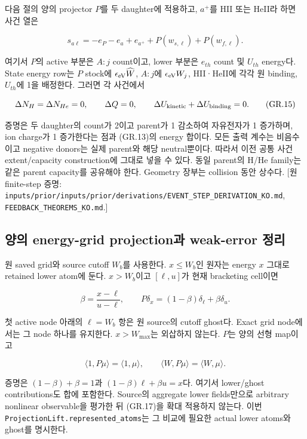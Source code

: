 \documentclass[11pt,a4paper]{article}
\begin{document}
다음 절의 양의 projector \(P\)를 두 daughter에 적용하고, \(a^+\)를 HII 또는 HeII라 하면 사건 열은

\[
 s_{a\ell}=-e_{P}-e_a+e_{a^+}
   +P(w_{s,\ell})+P(w_{f,\ell}).
\tag{GR.14}
\]

여기서 \(P\)의 active 부분은 \(A:j\) count이고, lower 부분은 \(e_{th}\) count 및 \(U_{th}\) energy다. State energy row는 \(P\) stock에 \(\epsilon_{\rm eV}\widehat W\), \(A:j\)에 \(\epsilon_{\rm eV}W_j\), HII·HeII에 각각 원 binding, \(U_{th}\)에 1을 배정한다. 그러면 각 사건에서

\[
 \Delta N_H=\Delta N_{He}=0,\qquad
 \Delta Q=0,\qquad
 \Delta U_{\rm kinetic}+\Delta U_{\rm binding}=0.
\tag{GR.15}
\]

증명은 두 daughter의 count가 2이고 parent가 1 감소하여 자유전자가 1 증가하며, ion charge가 1 증가한다는 점과 (GR.13)의 energy 합이다. 모든 출력 계수는 비음수이고 negative donors는 실제 parent와 해당 neutral뿐이다. 따라서 이전 공통 사건 extent/capacity construction에 그대로 넣을 수 있다. 동일 parent의 H/He family는 같은 parent capacity를 공유해야 한다. Geometry 장부는 collision 동안 상수다. {[}원 finite-step 증명: \nolinkurl{inputs/prior/inputs/prior/derivations/EVENT_STEP_DERIVATION_KO.md}, \texttt{FEEDBACK\_THEOREMS\_KO.md}.{]}

\hypertarget{uxc591uxc758-energy-grid-projectionuxacfc-weak-error-uxc815uxb9ac}{%
\subsection{양의 energy-grid projection과 weak-error 정리}\label{uxc591uxc758-energy-grid-projectionuxacfc-weak-error-uxc815uxb9ac}}

원 saved grid와 source cutoff \(W_b\)를 사용한다. \(x\le W_b\)인 원자는 energy \(x\) 그대로 retained lower atom에 둔다. \(x>W_b\)이고 \([\ell,u]\)가 현재 bracketing cell이면

\[
 \beta=\frac{x-\ell}{u-\ell},\qquad
 P\delta_x=(1-\beta)\delta_\ell+\beta\delta_u.
\tag{GR.16}
\]

첫 active node 아래의 \(\ell=W_b\) 항은 원 source의 cutoff ghost다. Exact grid node에서는 그 node 하나를 유지한다. \(x>W_{\max}\)는 외삽하지 않는다. \(P\)는 양의 선형 map이고

\[
 \langle1,P\mu\rangle=\langle1,\mu\rangle,\qquad
 \langle W,P\mu\rangle=\langle W,\mu\rangle.
\tag{GR.17}
\]

증명은 \((1-\beta)+\beta=1\)과 \((1-\beta)\ell+\beta u=x\)다. 여기서 lower/ghost contributions도 합에 포함한다. Source의 aggregate lower fields만으로 arbitrary nonlinear observable을 평가한 뒤 (GR.17)을 확대 적용하지 않는다. 이번 \nolinkurl{ProjectionLift.represented_atoms}는 그 비교에 필요한 actual lower atoms와 ghost를 명시한다.
\end{document}

